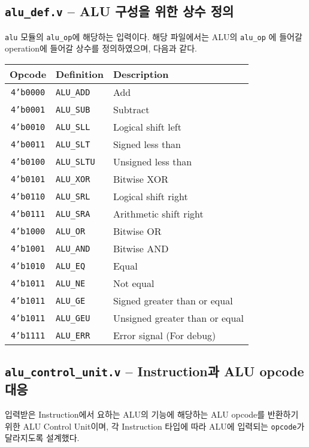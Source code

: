 \documentclass{scrartcl}
\begin{document}
\subsection{\texttt{alu\_def.v} -- ALU 구성을 위한 상수 정의}
\texttt{alu} 모듈의 \texttt{alu\_op}에 해당하는 입력이다. 해당 파일에서는 ALU의 \texttt{alu\_op} 에 들어갈
operation에 들어갈 상수를 정의하였으며, 다음과 같다.
\begin{center}
    \begin{tabular}{c l l}
        Opcode & Definition & Description \\ \hline
        \texttt{4'b0000} & \texttt{ALU\_ADD} & Add \\
        \texttt{4'b0001} & \texttt{ALU\_SUB} & Subtract \\
        \texttt{4'b0010} & \texttt{ALU\_SLL} & Logical shift left \\
        \texttt{4'b0011} & \texttt{ALU\_SLT} & Signed less than \\
        \texttt{4'b0100} & \texttt{ALU\_SLTU} & Unsigned less than \\
        \texttt{4'b0101} & \texttt{ALU\_XOR} & Bitwise XOR \\
        \texttt{4'b0110} & \texttt{ALU\_SRL} & Logical shift right \\
        \texttt{4'b0111} & \texttt{ALU\_SRA} & Arithmetic shift right \\
        \texttt{4'b1000} & \texttt{ALU\_OR} & Bitwise OR \\
        \texttt{4'b1001} & \texttt{ALU\_AND} & Bitwise AND \\
        \texttt{4'b1010} & \texttt{ALU\_EQ} & Equal \\
        \texttt{4'b1011} & \texttt{ALU\_NE} & Not equal \\
        \texttt{4'b1011} & \texttt{ALU\_GE} & Signed greater than or equal \\
        \texttt{4'b1011} & \texttt{ALU\_GEU} & Unsigned greater than or equal \\
        \texttt{4'b1111} & \texttt{ALU\_ERR} & Error signal (For debug)
    \end{tabular}
\end{center}

\subsection{\texttt{alu\_control\_unit.v} -- Instruction과 ALU opcode 대응}
입력받은 Instruction에서 요하는 ALU의 기능에 해당하는 ALU opcode를 반환하기 위한 ALU Control Unit이며,
각 Instruction 타입에 따라 ALU에 입력되는 \texttt{opcode}가 달라지도록 설계했다.
\end{document}
